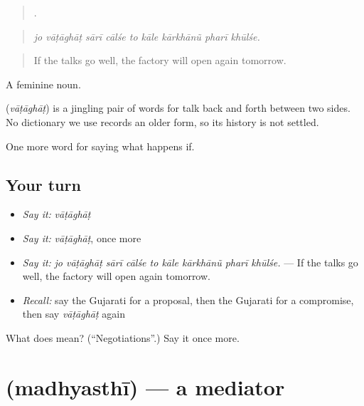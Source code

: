 \begin{quote}
        .
\end{quote}

\begin{quote}
\emph{jo vāṭāghāṭ sārī cālśe to kāle kārkhānũ pharī khūlśe.}
\end{quote}

\begin{quote}
If the talks go well, the factory will open again tomorrow.
\end{quote}

A feminine noun.

\begin{cousinweb}
\textbf{} (\emph{vāṭāghāṭ}) is a jingling pair of words for talk back and forth between two sides. No dictionary we use records an older form, so its history is not settled.
\end{cousinweb}

\begin{grammarlens}[title={What you've built}]
One more word for saying what happens if.
\end{grammarlens}

\subsection*{Your turn}
\begin{itemize}
\raggedright
  \item \emph{Say it:} \emph{vāṭāghāṭ}
  \item \emph{Say it:} \emph{vāṭāghāṭ}, once more
  \item \emph{Say it:} \emph{jo vāṭāghāṭ sārī cālśe to kāle kārkhānũ pharī khūlśe.} — If the talks go well, the factory will open again tomorrow.
  \item \emph{Recall:} say the Gujarati for a proposal, then the Gujarati for a compromise, then say \emph{vāṭāghāṭ} again
\end{itemize}

\begin{tcolorbox}[breakable,colback=teal!4,colframe=teal!35!black,title={Before you move on}]
What does  mean? (\textquotedblleft{}Negotiations\textquotedblright{}.) Say it once more.
\end{tcolorbox}
\section[\texorpdfstring{\gu{મધ્યસ્થી} (madhyasthī)}{મધ્યસ્થી (madhyasthī)}]{ (madhyasthī) — a mediator}

